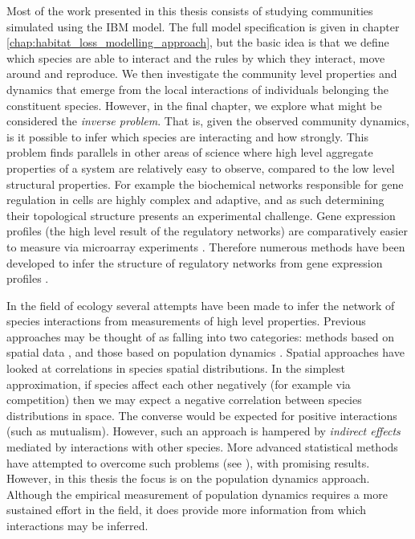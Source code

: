 Most of the work presented in this thesis consists of studying communities simulated using the IBM model. The full model specification is given in chapter \ref{chap:habitat_loss_modelling_approach}, but the basic idea is that we define which species are able to interact and the rules by which they interact, move around and reproduce. We then investigate the community level properties and dynamics that emerge from the local interactions of individuals belonging the constituent species. However, in the final chapter, we explore what might be considered the \emph{inverse problem}. That is, given the observed community dynamics, is it possible to infer which species are interacting and how strongly. This problem finds parallels in other areas of science  where high level aggregate properties of a system are relatively easy to observe, compared to the low level structural properties. For example the biochemical networks responsible for gene regulation in cells are highly complex and adaptive, and as such determining their topological structure presents an experimental challenge. Gene expression profiles (the high level result of the regulatory networks) are comparatively easier to measure via microarray experiments \cite{wang2006inferring}. Therefore numerous methods have been developed to infer the structure of regulatory networks from gene expression profiles \cite{zhao2006inferring,marbach2012wisdom}. 

In the field of ecology several attempts have been made to infer the network of species interactions from measurements of high level properties. Previous approaches may be thought of as falling into two categories: methods based on spatial data \cite{volkov2009,Harris018861}, and those based on population dynamics \cite{gilpin1973hares,sandvik2004using,froda2009simple,ives2003estimating,mutshinda2009drives}. Spatial approaches have looked at correlations in species spatial distributions. In the simplest approximation, if species affect each other negatively (for example via competition) then we may expect a negative correlation between species distributions in space. The converse would be expected for positive interactions (such as mutualism). However, such an approach is hampered by \emph{indirect effects} mediated by interactions with other species. More advanced statistical methods have attempted to overcome such problems (see \cite{Harris018861}), with promising results. However, in this thesis the focus is on the population dynamics approach. Although the empirical measurement of population dynamics requires a more sustained effort in the field, it does provide more information from which interactions may be inferred. %

